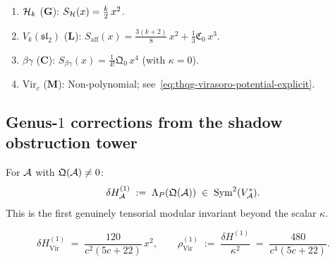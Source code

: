 \begin{example}
\label{ex:thqg-four-potentials}
\begin{enumerate}[label=\textup{(\alph*)}]
\item $\mathcal{H}_k$ ($\mathbf{G}$):
 $S_{\mathcal{H}}(x) = \frac{k}{2}\,x^2$.
\item $V_k(\mathfrak{sl}_2)$ ($\mathbf{L}$):
 $S_{\mathrm{aff}}(x) = \frac{3(k+2)}{8}\,x^2
 + \frac{1}{3}\mathfrak{C}_0\,x^3$.
\item $\beta\gamma$ ($\mathbf{C}$):
 $S_{\beta\gamma}(x) = \frac{1}{4!}\mathfrak{Q}_0\,x^4$
 (with $\kappa = 0$).
\item $\mathrm{Vir}_c$ ($\mathbf{M}$):
 Non-polynomial; see~\eqref{eq:thqg-virasoro-potential-explicit}.
\end{enumerate}
\end{example}



\subsection{Genus-$1$ corrections from the shadow obstruction tower}
\label{subsec:thqg-genus1-corrections}

\begin{theorem}
\label{thm:thqg-genus1-hessian}
\ClaimStatusProvedHere
{}
For $\mathcal{A}$ with $\mathfrak{Q}(\mathcal{A}) \neq 0$:
\begin{equation}\label{eq:thqg-genus1-hessian}
\delta H^{(1)}_{\mathcal{A}}
\;:=\;
\Lambda_P(\mathfrak{Q}(\mathcal{A}))
\;\in\;
\operatorname{Sym}^2(V_{\mathcal{A}}^*).
\end{equation}
This is the first genuinely tensorial modular invariant
beyond the scalar $\kappa$.
\end{theorem}

\begin{corollary}
\label{cor:thqg-virasoro-genus1}
\ClaimStatusProvedHere
{}
\begin{equation}\label{eq:thqg-virasoro-genus1-hessian}
\delta H^{(1)}_{\mathrm{Vir}}
\;=\;
\frac{120}{c^2(5c+22)}\,x^2,
\qquad
\rho^{(1)}_{\mathrm{Vir}}
\;:=\;
\frac{\delta H^{(1)}}{\kappa^2}
\;=\;
\frac{480}{c^4(5c+22)}.
\end{equation}
\end{corollary}

